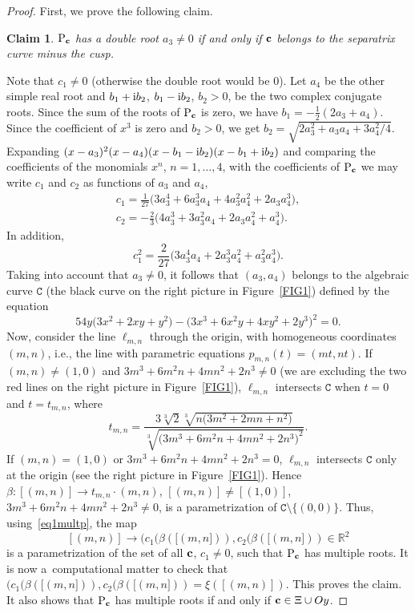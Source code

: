 \documentclass[pdftex]{sigma}
\numberwithin{equation}{section}
\newtheorem*{Claim*}{Claim}
\def\R{\mathbb{R}}
\begin{document}
\begin{proof}
First, we prove the following claim.

\begin{Claim*} ${\rm P}_{{\bf c}}$ has a double root $a_3\neq 0$ if and only {if} ${\bf c}$ belongs
to the separatrix curve minus the cusp.
\end{Claim*}

Note that $c_1\neq 0$ (otherwise the double root would be $0$). Let $a_4$ be the other simple real root and $b_1+{\rm i}b_2$,
$b_1-{\rm i}b_2$, $b_2>0$, be the two complex conjugate roots.
Since the sum of the roots of ${\rm P}_{{\bf c}}$ is zero, we have $b_1=-\frac{1}{2}(2a_3+a_4)$.
Since the coefficient of $x^3$ is zero and $b_2>0$, we get $b_2=\sqrt{2a_3^2+a_3a_4+3a_4^2/4}$.
Expanding $(x-a_3)^2(x-a_4)(x-b_1-{\rm i}b_2)(x-b_1+{\rm i}b_2)$
and comparing the {coefficients} of the
monomials $x^n$, $n=1,\dots, 4$, with the coefficients of ${\rm P}_{{\bf c}}$ we may write $c_1$ and
$c_2$ as functions of $a_3$ and $a_4$,
\begin{gather}
 c_1=\frac{1}{27}\big(3a_3^4+6a_3^3a_4+4a_3^2a_4^2+2a_3a_4^3\big),\nonumber\\
c_2=-\frac{2}{3}\big(4a_3^3+3a_3^2a_4+2a_3a_4^2+a_4^3\big).\label{eq1multp}
\end{gather}
In addition,
\[
 c_1^2=\frac{2}{27}\big(3a_3^4a_4+2a_3^3a_4^2+a_3^2a_4^3\big).
\]
Taking into account that $a_3\neq 0$, it follows that $(a_3,a_4)$ belongs to the algebraic curve
${\mathtt C}$ (the black curve on the right picture in Figure~\ref{FIG1}) defined by the equation
\[
 54y\big(3x^2+2xy+y^2\big)-\big(3x^3+6x^2y+4xy^2+2y^3\big)^2=0.
\]
Now, consider the line $\ell_{m,n}$ through the origin, with homogeneous coordinates $(m,n)$, i.e., the line with parametric
equations $p_{m,n}(t)=(mt,nt)$.
If $(m,n)\neq (1,0)$ and $3m^3+6m^2n+4mn^2+2n^3\neq 0$ (we are excluding the two red lines
on the right picture in Figure~\ref{FIG1}), $\ell_{m,n}$
intersects ${\mathtt C}$ when $t=0$ and $t=t_{m,n}$,
where
\[
 t_{m,n}=\frac{3\sqrt[3]{2}\sqrt[3]{n\big(3m^2+2mn+n^2\big)}}{\sqrt[3]{\big(3m^3+6m^2n+4mn^2+2n^3\big)^2}}.
\]
If {$(m,n)= (1,0)$}
or $3m^3+6m^2n+4mn^2+2n^3= 0$, $\ell_{m,n}$ intersects ${\mathtt C}$ only at the origin
(see the right picture in Figure~\ref{FIG1}). Hence
$\beta \colon [(m,n)]\to t_{m,n}\cdot (m,n)$, $[(m,n)]\neq [(1,0)]$,
$3m^3+6m^2n+4mn^2+2n^3\neq 0$, is a parametrization of ${\mathtt C}\setminus \{(0,0)\}$.
Thus, using~\eqref{eq1multp}, the map
\[
 [(m,n)]\to (c_1(\beta([(m,n])),c_2(\beta([(m,n]))\in \R^2
\]
is a parametrization of the set of all ${\bf c}$, $c_1\neq 0$, such that $\mathrm{P}_{{\bf c}}$ has multiple roots.
It is now a~computational matter to check that
$(c_1(\beta([(m,n])),c_2(\beta([(m,n]))=\xi([(m,n)])$. This proves the claim. It also shows that ${\rm P}_{{\bf c}}$
has multiple roots if and only if ${\bf c}\in \Xi\cup Oy$.



\end{proof}
\end{document}
